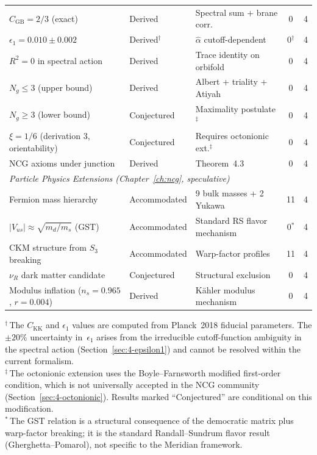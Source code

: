 \documentclass[10pt,a4paper,openany,twocolumn]{book}
\theoremstyle{definition}
\theoremstyle{remark}
\begin{document}
\begin{center}
\begin{longtable}{p{4.8cm} l p{4.2cm} c c}
$C_\mathrm{GB} = 2/3$ (exact) & Derived & Spectral sum + brane corr. & 0 & 4 \\
$\epsilon_1 = 0.010 \pm 0.002$ & Derived$^\dag$ & $\hat{\alpha}$ cutoff-dependent & 0$^\dag$ & 4 \\
$R^2 = 0$ in spectral action & Derived & Trace identity on orbifold & 0 & 4 \\
$N_g \leq 3$ (upper bound) & Derived & Albert + triality + Atiyah & 0 & 4 \\
$N_g \geq 3$ (lower bound) & Conjectured & Maximality postulate$^\ddag$ & 0 & 4 \\
$\xi = 1/6$ (derivation 3, orientability) & Conjectured & Requires octonionic ext.$^\ddag$ & 0 & 4 \\
NCG axioms under junction & Derived & Theorem~4.3 & 0 & 4 \\[6pt]
\multicolumn{5}{l}{\emph{Particle Physics Extensions (Chapter~\ref{ch:ncg}, speculative)}} \\[3pt]
Fermion mass hierarchy & Accommodated & 9 bulk masses + 2 Yukawa & 11 & 4 \\
$|V_{us}| \approx \sqrt{m_d/m_s}$ (GST) & Accommodated & Standard RS flavor mechanism & 0$^*$ & 4 \\
CKM structure from $S_3$ breaking & Accommodated & Warp-factor profiles & 11 & 4 \\
$\nu_R$ dark matter candidate & Conjectured & Structural exclusion & 0 & 4 \\
Modulus inflation ($n_s = 0.965$, $r = 0.004$) & Derived & K\"ahler modulus mechanism & 0 & 4 \\[3pt]
\hline
\end{longtable}
\end{center}

\noindent
\footnotesize
$^\dag$\,The $C_\mathrm{KK}$ and $\epsilon_1$ values are computed from Planck~2018 fiducial parameters. The $\pm 20\%$ uncertainty in~$\epsilon_1$ arises from the irreducible cutoff-function ambiguity in the spectral action (Section~\ref{sec:4-epsilon1}) and cannot be resolved within the current formalism.\\[2pt]
$^\ddag$\,The octonionic extension uses the Boyle--Farnsworth modified first-order condition, which is not universally accepted in the NCG community (Section~\ref{sec:4-octonionic}). Results marked ``Conjectured'' are conditional on this modification.\\[2pt]
$^*$\,The GST relation is a structural consequence of the democratic matrix plus warp-factor breaking; it is the standard Randall--Sundrum flavor result (Gherghetta--Pomarol), not specific to the Meridian framework.
\end{document}
